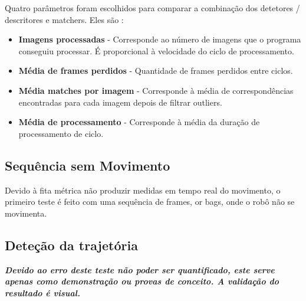 Quatro parâmetros foram escolhidos para comparar a combinação dos detetores / descritores e matchers. Eles são :

\begin{itemize}
	\item \textbf{Imagens processadas} - Corresponde ao número de imagens que o programa conseguiu processar. É proporcional à velocidade do ciclo de processamento.
	\item \textbf{Média de frames perdidos} - Quantidade de frames perdidos entre ciclos.
	\item \textbf{Média matches por imagem} - Corresponde à média de correspondências encontradas para cada imagem depois de filtrar outliers.
	\item \textbf{Média de processamento} - Corresponde à média da duração de processamento de ciclo.
\end{itemize}


\subsection{Sequência sem Movimento}

Devido à fita métrica não produzir medidas em tempo real do movimento, o primeiro teste é feito com uma sequência de frames, or bags, onde o robô não se movimenta.

\subsection{Deteção da trajetória}

\textit{\textbf{
Devido ao erro deste teste não poder ser quantificado, este serve apenas como demonstração ou provas de conceito. A validação do resultado é visual.}}

